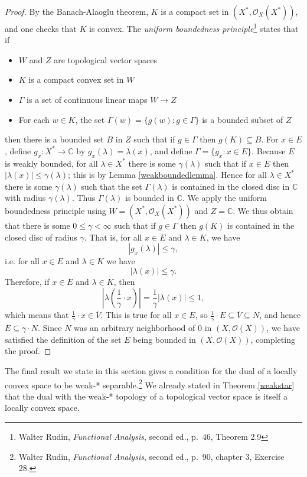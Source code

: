 \documentclass{article}
\begin{document}
\begin{proof}
By the Banach-Alaoglu theorem, $K$ is a compact set in $(X^*,\mathcal{O}_X(X^*))$, and one checks that $K$ is convex.
The {\em uniform boundedness principle}\footnote{Walter Rudin, {\em Functional Analysis}, second ed., p.~46, Theorem 2.9}
states that if 
\begin{itemize}
\item $W$ and $Z$ are topological vector spaces
\item $K$ is a compact convex set in $W$
\item $\Gamma$ is a set of continuous linear maps $W \to Z$
\item For each $w \in K$, the set $\Gamma(w)=\{g(w):g \in \Gamma\}$ is a bounded subset of $Z$
\end{itemize}
then there is a bounded set $B$ in $Z$ such that if $g \in \Gamma$ then $g(K) \subseteq
B$.
For $x \in E$, define $g_x:X^* \to \mathbb{C}$ by $g_x(\lambda)=\lambda(x)$, and define $\Gamma=\{g_x:x \in E\}$.
Because $E$ is weakly bounded,  for all $\lambda \in X^*$ there is some $\gamma(\lambda)$ such that
if $x \in E$ then $|\lambda(x)| \leq \gamma(\lambda)$; this is by  Lemma \ref{weakboundedlemma}.
Hence for all $\lambda \in X^*$ there is some $\gamma(\lambda)$ such that
 the set $\Gamma(\lambda)$
is contained in the closed disc in $\mathbb{C}$ with radius $\gamma(\lambda)$. 
Thus  $\Gamma(\lambda)$ is bounded in $\mathbb{C}$.
We apply the uniform boundedness principle using $W=(X^*,\mathcal{O}_X(X^*))$ and $Z=\mathbb{C}$. 
We thus obtain that there is some
$0 \leq \gamma<\infty$ such that if $g \in \Gamma$ then $g(K)$ is contained in the closed disc of radius $\gamma$. That is,
for all $x \in E$ and $\lambda \in K$, we have
\[
|g_x(\lambda)| \leq \gamma,
\] 
i.e. for all $x \in E$ and $\lambda \in K$ we have
\[
|\lambda(x)| \leq \gamma.
\]
Therefore,
if $x \in E$ and $\lambda \in K$, then 
\[
\left| \lambda\left( \frac{1}{\gamma} \cdot x\right) \right| = \frac{1}{\gamma} |\lambda(x)| \leq 1,
\]
which means that $\frac{1}{\gamma}\cdot x \in \overline{V}$. This is true for all $x \in E$, so $\frac{1}{\gamma}\cdot E \subseteq \overline{V} \subseteq N$, and
hence $E \subseteq \gamma\cdot N$. Since $N$ was an arbitrary
neighborhood of $0$ in $(X,\mathcal{O}(X))$, we have satisfied  the definition of the set $E$ being bounded in
$(X,\mathcal{O}(X))$, completing the proof.
\end{proof}

The final result we state in this section gives a condition for the dual of a locally convex space to be weak-* separable.\footnote{Walter Rudin, {\em Functional Analysis},
second ed., p.~90, chapter 3, Exercise 28.} We already stated
in Theorem \ref{weakstar} that the dual with the weak-* topology of a topological vector space is itself a locally
convex space.
\end{document}
